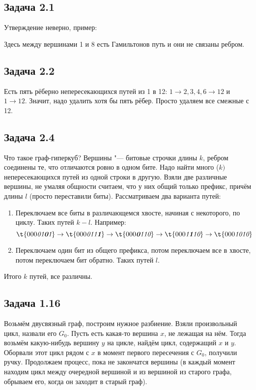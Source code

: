 \subsection{Задача 2.1}
	Утверждение неверно, пример:
	\begin{center}
	\end{center}
	Здесь между вершинами 1 и 8 есть Гамильтонов путь и они не связаны ребром.

\subsection{Задача 2.2}
	Есть пять рёберно непересекающихся путей из 1 в 12: $1 \to 2, 3, 4, 6 \to 12$ и $1 \to 12$.
	Значит, надо удалить хотя бы пять рёбер.
	Просто удаляем все смежные с 12.

\subsection{Задача 2.4}
	Что такое граф-гиперкуб?
	Вершины "--- битовые строчки длины $k$, ребром соединены те, что отличаются ровно в одном бите.
	Надо найти много ($k)$ непересекающихся путей из одной строки в другую.
	Взяли две различные вершины, не умаляя общности считаем, что у них общий только префикс, причём длины $l$
	(просто переставили биты).
	Рассматриваем два варианта путей:
	\begin{enumerate}
		\item
			Переключаем все биты в различающемся хвосте, начиная с некоторого, по циклу.
			Таких путей $k-l$. Например:
			\[
				\t{000\textit{01\textbf{0}1}} \to
				\t{000\textit{011\textbf{1}}} \to
				\t{000\textit{\textbf{0}110}} \to
				\t{000\textit{1\textbf{1}10}} \to
				\t{000\textit{1010}}
			\]
		\item
			Переключаем один бит из общего префикса, потом переключаем все в хвосте, потом переключаем бит обратно.
			Таких путей $l$.
	\end{enumerate}
	Итого $k$ путей, все различны.

\subsection{Задача 1.16}
	Возьмём двусвязный граф, построим нужное разбиение.
	Взяли произвольный цикл, назвали его $G_0$.
	Пусть есть какая-то вершина $x$, не лежащая на нём.
	Тогда возьмём какую-нибудь вершину $y$ на цикле, найдём цикл, содержащий $x$ и $y$.
	Оборвали этот цикл рядом с $x$ в момент первого пересечения с $G_0$,
	получили ручку.
	Продолжаем процесс, пока не закончатся вершины (в каждый момент находим цикл между очередной
	вершиной и из вершиной из старого графа, обрываем его, когда он заходит в старый граф).

